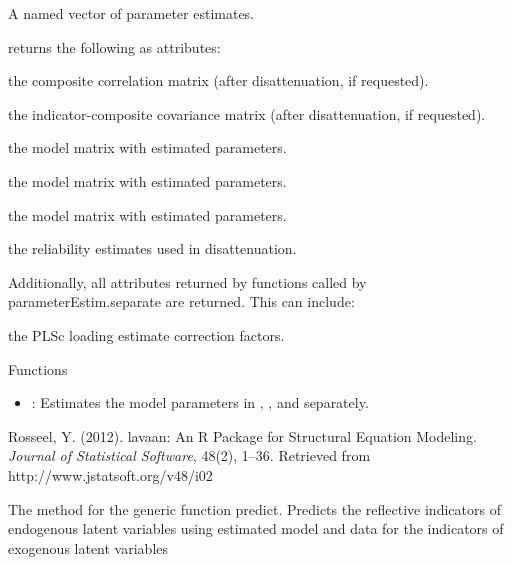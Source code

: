 \documentclass[a4paper]{book}
\begin{document}
%
\begin{Value}
A named vector of parameter estimates.

 returns the following as attributes:

\begin{ldescription}
\item[\code{C}] the composite correlation matrix (after disattenuation, if requested).
\item[\code{IC}] the indicator-composite covariance matrix (after disattenuation, if requested).
\item[\code{inner}] the  model matrix with estimated parameters.
\item[\code{reflective}] the  model matrix with estimated parameters.
\item[\code{formative}] the  model matrix with estimated parameters.
\item[\code{Q}] the reliability estimates used in disattenuation.

\end{ldescription}
Additionally, all attributes returned by functions called by parameterEstim.separate are returned.
This can include:
\begin{ldescription}
\item[\code{c}] the PLSc loading estimate correction factors.
\end{ldescription}
\end{Value}
%
\begin{Section}{Functions}
\begin{itemize}

\item{} : Estimates the model parameters in , , and
 separately.

\end{itemize}
\end{Section}
%
\begin{References}\relax
Rosseel, Y. (2012). lavaan: An R Package for Structural Equation Modeling. \emph{Journal of Statistical Software}, 48(2), 1–36. Retrieved from http://www.jstatsoft.org/v48/i02
\end{References}
%
\begin{Description}\relax
The  method for the generic function  predict.
Predicts the reflective indicators of endogenous latent variables using
estimated model and data for the indicators of exogenous latent variables
\end{Description}
\end{document}
